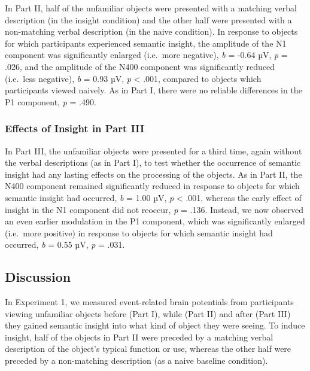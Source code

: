 \documentclass[
  english,
  man,11pt,floatsintext]{apa7}
\begin{document}
In Part II, half of the unfamiliar objects were presented with a matching verbal description (in the insight condition) and the other half were presented with a non-matching verbal description (in the naive condition). In response to objects for which participants experienced semantic insight, the amplitude of the N1 component was significantly enlarged (i.e.~more negative), \emph{b} = -0.64 µV, \emph{p} = .026, and the amplitude of the N400 component was significantly reduced (i.e.~less negative), \emph{b} = 0.93 µV, \emph{p} \textless{} .001, compared to objects which participants viewed naively. As in Part I, there were no reliable differences in the P1 component, \emph{p} = .490.

\hypertarget{effects-of-insight-in-part-iii}{%
\subsubsection{Effects of Insight in Part III}\label{effects-of-insight-in-part-iii}}

In Part III, the unfamiliar objects were presented for a third time, again without the verbal descriptions (as in Part I), to test whether the occurrence of semantic insight had any lasting effects on the processing of the objects. As in Part II, the N400 component remained significantly reduced in response to objects for which semantic insight had occurred, \emph{b} = 1.00 µV, \emph{p} \textless{} .001, whereas the early effect of insight in the N1 component did not reoccur, \emph{p} = .136. Instead, we now observed an even earlier modulation in the P1 component, which was significantly enlarged (i.e.~more positive) in response to objects for which semantic insight had occurred, \emph{b} = 0.55 µV, \emph{p} = .031.

\hypertarget{discussion}{%
\subsection{Discussion}\label{discussion}}

In Experiment 1, we measured event-related brain potentials from participants viewing unfamiliar objects before (Part I), while (Part II) and after (Part III) they gained semantic insight into what kind of object they were seeing. To induce insight, half of the objects in Part II were preceded by a matching verbal description of the object's typical function or use, whereas the other half were preceded by a non-matching description (as a naive baseline condition).
\end{document}
